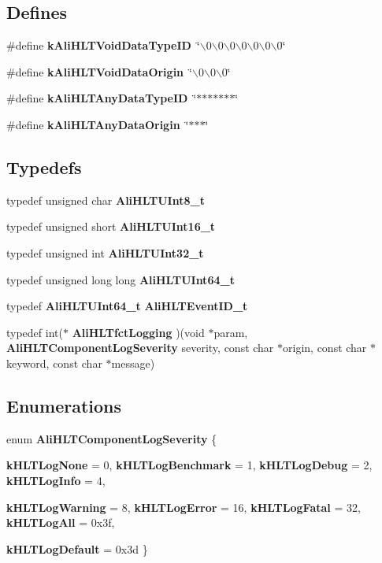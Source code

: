 \subsection*{Defines}
\begin{CompactItemize}
\item 
\#define {\bf k\-Ali\-HLTVoid\-Data\-Type\-ID}\ \char`\"{}$\backslash$0$\backslash$0$\backslash$0$\backslash$0$\backslash$0$\backslash$0$\backslash$0\char`\"{}
\item 
\#define {\bf k\-Ali\-HLTVoid\-Data\-Origin}\ \char`\"{}$\backslash$0$\backslash$0$\backslash$0\char`\"{}
\item 
\#define {\bf k\-Ali\-HLTAny\-Data\-Type\-ID}\ \char`\"{}$\ast$$\ast$$\ast$$\ast$$\ast$$\ast$$\ast$\char`\"{}
\item 
\#define {\bf k\-Ali\-HLTAny\-Data\-Origin}\ \char`\"{}$\ast$$\ast$$\ast$\char`\"{}
\end{CompactItemize}
\subsection*{Typedefs}
\begin{CompactItemize}
\item 
typedef unsigned char {\bf Ali\-HLTUInt8\_\-t}
\item 
typedef unsigned short {\bf Ali\-HLTUInt16\_\-t}
\item 
typedef unsigned int {\bf Ali\-HLTUInt32\_\-t}
\item 
typedef unsigned long long {\bf Ali\-HLTUInt64\_\-t}
\item 
typedef {\bf Ali\-HLTUInt64\_\-t} {\bf Ali\-HLTEvent\-ID\_\-t}
\item 
typedef int($\ast$ {\bf Ali\-HLTfct\-Logging} )(void $\ast$param, {\bf Ali\-HLTComponent\-Log\-Severity} severity, const char $\ast$origin, const char $\ast$keyword, const char $\ast$message)
\end{CompactItemize}
\subsection*{Enumerations}
\begin{CompactItemize}
\item 
enum {\bf Ali\-HLTComponent\-Log\-Severity} \{ \par
{\bf k\-HLTLog\-None} = 0, 
{\bf k\-HLTLog\-Benchmark} = 1, 
{\bf k\-HLTLog\-Debug} = 2, 
{\bf k\-HLTLog\-Info} = 4, 
\par
{\bf k\-HLTLog\-Warning} = 8, 
{\bf k\-HLTLog\-Error} = 16, 
{\bf k\-HLTLog\-Fatal} = 32, 
{\bf k\-HLTLog\-All} = 0x3f, 
\par
{\bf k\-HLTLog\-Default} = 0x3d
 \}
\end{CompactItemize}
